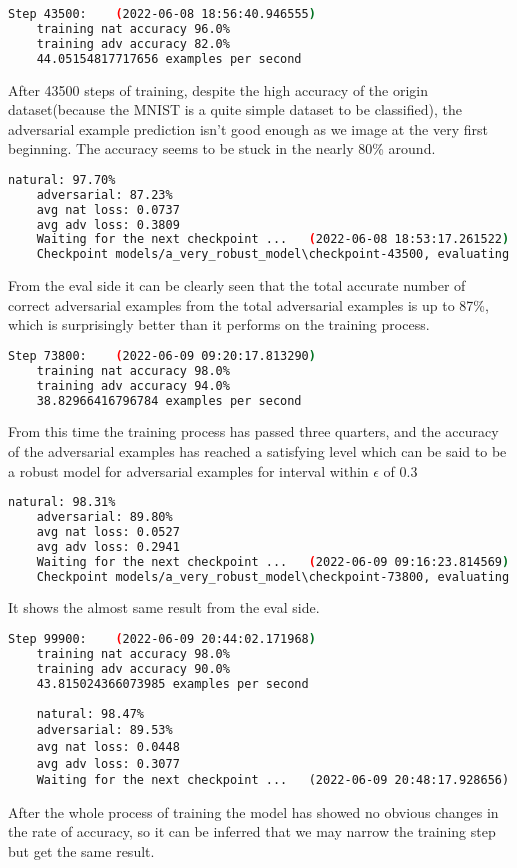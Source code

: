 \documentclass[
	letterpaper, %
	10pt, %
]{CSUniSchoolLabReport}
\begin{document}
\begin{lstlisting}[language=bash]
	Step 43500:    (2022-06-08 18:56:40.946555)
	training nat accuracy 96.0%
	training adv accuracy 82.0%
	44.05154817717656 examples per second
\end{lstlisting}
After 43500 steps of training, despite the high accuracy of the origin dataset(because the MNIST is a quite simple dataset to be classified), the adversarial example prediction isn't good enough as we image at the very first beginning. The accuracy seems to be stuck in the nearly 80\% around.
\begin{lstlisting}[language=bash]
	natural: 97.70%
	adversarial: 87.23%
	avg nat loss: 0.0737
	avg adv loss: 0.3809
	Waiting for the next checkpoint ...   (2022-06-08 18:53:17.261522)   ....................
	Checkpoint models/a_very_robust_model\checkpoint-43500, evaluating ...   (2022-06-08 18:56:47.647872
\end{lstlisting}
From the eval side it can be clearly seen that the total accurate number of correct adversarial examples from the total adversarial examples is up to 87\%, which is surprisingly better than it performs on the training process.
\begin{lstlisting}[language=bash]
	Step 73800:    (2022-06-09 09:20:17.813290)
	training nat accuracy 98.0%
	training adv accuracy 94.0%
	38.82966416796784 examples per second
\end{lstlisting}
From this time the training process has passed three quarters, and the accuracy of the adversarial examples has reached a satisfying level which can be said to be a robust model for adversarial examples for interval within $\epsilon$ of 0.3
\begin{lstlisting}[language=bash]
	natural: 98.31%
	adversarial: 89.80%
	avg nat loss: 0.0527
	avg adv loss: 0.2941
	Waiting for the next checkpoint ...   (2022-06-09 09:16:23.814569)   .......................
	Checkpoint models/a_very_robust_model\checkpoint-73800, evaluating ...   (2022-06-09 09:20:24.178603)
\end{lstlisting}
It shows the almost same result from the eval side.
\begin{lstlisting}[language=bash]
	Step 99900:    (2022-06-09 20:44:02.171968)
	training nat accuracy 98.0%
	training adv accuracy 90.0%
	43.815024366073985 examples per second
\end{lstlisting}
\begin{lstlisting}
	natural: 98.47%
	adversarial: 89.53%
	avg nat loss: 0.0448
	avg adv loss: 0.3077
	Waiting for the next checkpoint ...   (2022-06-09 20:48:17.928656)
\end{lstlisting}
After the whole process of training the model has showed no obvious changes in the rate of accuracy, so it can be inferred that we may narrow the training step but get the same result.
\end{document}
